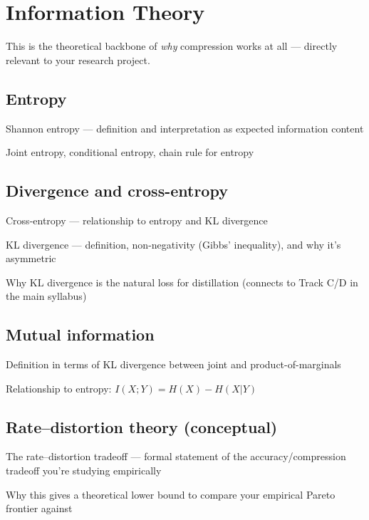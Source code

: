 \documentclass[11pt]{article}
\newcommand{\note}[1]{\textcolor{gray!70!black}{\small #1}}
\begin{document}
\section{Information Theory}
\note{This is the theoretical backbone of \emph{why} compression works at all — directly relevant to your research project.}

\subsection{Entropy}
\begin{tasklist}
    \item Shannon entropy — definition and interpretation as expected information content
    \item Joint entropy, conditional entropy, chain rule for entropy
\end{tasklist}

\subsection{Divergence and cross-entropy}
\begin{tasklist}
    \item Cross-entropy — relationship to entropy and KL divergence
    \item KL divergence — definition, non-negativity (Gibbs' inequality), and why it's asymmetric
    \item Why KL divergence is the natural loss for distillation (connects to Track C/D in the main syllabus)
\end{tasklist}

\subsection{Mutual information}
\begin{tasklist}
    \item Definition in terms of KL divergence between joint and product-of-marginals
    \item Relationship to entropy: $I(X;Y) = H(X) - H(X|Y)$
\end{tasklist}

\subsection{Rate--distortion theory (conceptual)}
\begin{tasklist}
    \item The rate--distortion tradeoff — formal statement of the accuracy/compression tradeoff you're studying empirically
    \item Why this gives a theoretical lower bound to compare your empirical Pareto frontier against
\end{tasklist}
\end{document}
